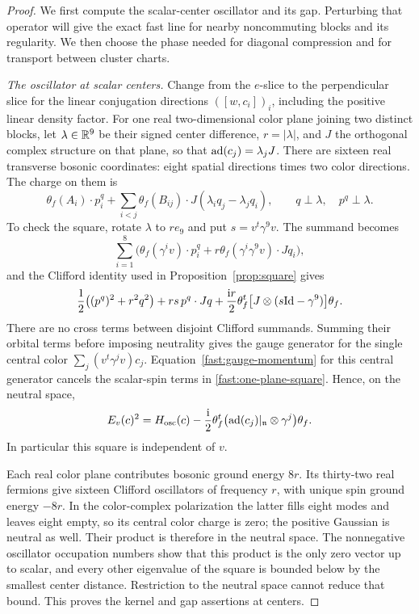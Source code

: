 \begin{proof}
We first compute the scalar-center oscillator and its gap. Perturbing
that operator will give the exact fast line for nearby noncommuting
blocks and its regularity. We then choose the phase needed for diagonal
compression and for transport between cluster charts.

\smallskip\noindent\emph{The oscillator at scalar centers.}
Change from the $e$-slice to the perpendicular slice for the
linear conjugation directions $([w,c_i])_i$, including the positive
linear density factor. For one real two-dimensional color plane
joining two distinct blocks, let $\lambda\in\mathbb R^9$ be their signed
center difference, $r=|\lambda|$, and $J$ the orthogonal complex
structure on that plane, so that $\operatorname{ad}(c_j)=\lambda_jJ$. There are
sixteen real transverse bosonic coordinates: eight spatial directions
times two color directions. The charge on them is
\[
 \theta_f(A_i)\cdot p_i^q+
 \sum_{i<j}\theta_f(B_{ij})\cdot
                       J(\lambda_iq_j-\lambda_jq_i),
 \qquad q\perp\lambda,\quad p^q\perp\lambda.
\]
To check the square, rotate $\lambda$ to $r e_9$ and put
$s=v^t\gamma^9v$. The summand becomes
\[
 \sum_{i=1}^8\bigl(
 \theta_f(\gamma^iv)\cdot p_i^q
 +r\theta_f(\gamma^i\gamma^9v)\cdot Jq_i\bigr),
\]
and the Clifford identity used in Proposition~\ref{prop:square} gives
\begin{equation}
 \frac12\bigl((p^q)^2+r^2q^2\bigr)
 +rs\,p^q\cdot Jq
 +\frac{\mathrm i r}{2}\theta_f^t
                   \bigl[J\otimes(s\mathrm{Id}-\gamma^9)\bigr]\theta_f.
 \label{fast:one-plane-square}
\end{equation}
There are no cross terms between disjoint Clifford summands. Summing
their orbital terms before imposing neutrality gives the gauge
generator for the single central color
$\sum_j(v^t\gamma^jv)c_j$. Equation~\eqref{fast:gauge-momentum} for
this central generator cancels the scalar-spin terms in
\eqref{fast:one-plane-square}. Hence, on the neutral space,
\begin{equation}
 E_v(c)^2=H_{\mathrm{osc}}(c)
       -\frac{\mathrm i}{2}\theta_f^t
                   \bigl(\operatorname{ad}(c_j)|_{\mathfrak n}\otimes\gamma^j\bigr)
                    \theta_f.
 \label{fast:neutral-square}
\end{equation}
In particular this square is independent of $v$.

Each real color plane contributes bosonic ground energy $8r$.
Its thirty-two real fermions give sixteen Clifford oscillators of
frequency $r$, with unique spin ground energy $-8r$. In the
color-complex polarization the latter fills eight modes and leaves
eight empty, so its central color charge is zero; the positive
Gaussian is neutral as well. Their product is therefore in the
neutral space. The nonnegative oscillator occupation numbers show
that this product is the only zero vector up to scalar, and every
other eigenvalue of the square is bounded below by the smallest
center distance. Restriction to the neutral space cannot reduce
that bound. This proves the kernel and gap assertions at centers.


\end{proof}
